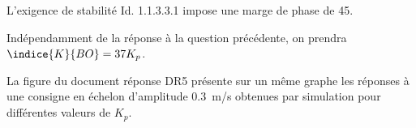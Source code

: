 L’exigence de stabilité Id. 1.1.3.3.1 impose une marge de phase de 45\degres.

Indépendamment de la réponse à la question précédente, on prendra $\indice{K}{BO} = 37K_p$.


La figure du document réponse DR5 présente sur un même graphe les réponses à une consigne en
échelon d’amplitude \SI{0,3}{m/s} obtenues par simulation pour différentes valeurs de $K_p$.

